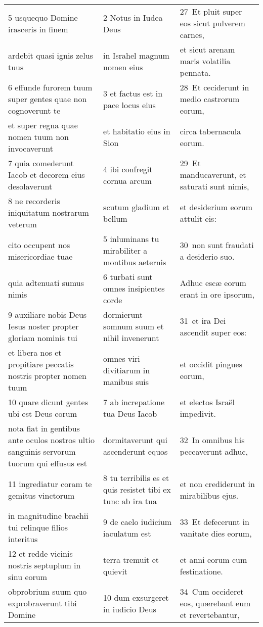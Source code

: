 \documentclass{article}
\begin{document}
\begin{longtable}{@{}p{}p{}p{}@{}}
5 usquequo Domine irasceris in finem	&	2 Notus in Iudea Deus	&	27 Et pluit super eos sicut pulverem carnes,	\\
ardebit quasi ignis zelus tuus	&	in Israhel magnum nomen eius	&	et sicut arenam maris volatilia pennata.	\\
6 effunde furorem tuum super gentes quae non cognoverunt te	&	3 et factus est in pace locus eius	&	28 Et ceciderunt in medio castrorum eorum,	\\
et super regna quae nomen tuum non invocaverunt	&	et habitatio eius in Sion	&	circa tabernacula eorum.	\\
7 quia comederunt Iacob et decorem eius desolaverunt	&	4 ibi confregit cornua arcum	&	29 Et manducaverunt, et saturati sunt nimis,	\\
8 ne recorderis iniquitatum nostrarum veterum	&	scutum gladium et bellum	&	et desiderium eorum attulit eis:	\\
cito occupent nos misericordiae tuae	&	5 inluminans tu mirabiliter a montibus aeternis	&	30 non sunt fraudati a desiderio suo.	\\
quia adtenuati sumus nimis	&	6 turbati sunt omnes insipientes corde	&	Adhuc escæ eorum erant in ore ipsorum,	\\
9 auxiliare nobis Deus Iesus noster propter gloriam nominis tui	&	dormierunt somnum suum et nihil invenerunt	&	31 et ira Dei ascendit super eos:	\\
et libera nos et propitiare peccatis nostris propter nomen tuum	&	omnes viri divitiarum in manibus suis	&	et occidit pingues eorum,	\\
10 quare dicunt gentes ubi est Deus eorum	&	7 ab increpatione tua Deus Iacob	&	et electos Israël impedivit.	\\
nota fiat in gentibus ante oculos nostros ultio sanguinis servorum tuorum qui effusus est	&	dormitaverunt qui ascenderunt equos	&	32 In omnibus his peccaverunt adhuc,	\\
11 ingrediatur coram te gemitus vinctorum	&	8 tu terribilis es et quis resistet tibi ex tunc ab ira tua	&	et non crediderunt in mirabilibus ejus.	\\
in magnitudine brachii tui relinque filios interitus	&	9 de caelo iudicium iaculatum est	&	33 Et defecerunt in vanitate dies eorum,	\\
12 et redde vicinis nostris septuplum in sinu eorum	&	terra tremuit et quievit	&	et anni eorum cum festinatione.	\\
obprobrium suum quo exprobraverunt tibi Domine	&	10 dum exsurgeret in iudicio Deus	&	34 Cum occideret eos, quærebant eum et revertebantur,	\\

\end{longtable}
\end{document}
